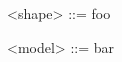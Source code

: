 \documentclass{article}
\begin{document}
\begin{grammar}
<shape> ::= foo
\vskip 0pt

<model> ::= bar
\end{grammar}
\end{document}
